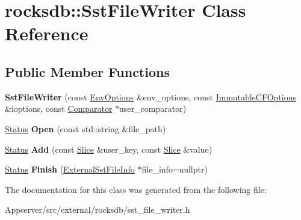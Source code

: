 \hypertarget{classrocksdb_1_1SstFileWriter}{}\section{rocksdb\+:\+:Sst\+File\+Writer Class Reference}
\label{classrocksdb_1_1SstFileWriter}
\subsection*{Public Member Functions}
\begin{DoxyCompactItemize}
\item 
{\bfseries Sst\+File\+Writer} (const \hyperlink{structrocksdb_1_1EnvOptions}{Env\+Options} \&env\+\_\+options, const \hyperlink{structrocksdb_1_1ImmutableCFOptions}{Immutable\+C\+F\+Options} \&ioptions, const \hyperlink{classrocksdb_1_1Comparator}{Comparator} $\ast$user\+\_\+comparator)\hypertarget{classrocksdb_1_1SstFileWriter_a1fe4d1f2d5ad4b1ad8257818d56fdeed}{}\label{classrocksdb_1_1SstFileWriter_a1fe4d1f2d5ad4b1ad8257818d56fdeed}

\item 
\hyperlink{classrocksdb_1_1Status}{Status} {\bfseries Open} (const std\+::string \&file\+\_\+path)\hypertarget{classrocksdb_1_1SstFileWriter_a7093b68b582eaa567eb5ab6d0c87eaba}{}\label{classrocksdb_1_1SstFileWriter_a7093b68b582eaa567eb5ab6d0c87eaba}

\item 
\hyperlink{classrocksdb_1_1Status}{Status} {\bfseries Add} (const \hyperlink{classrocksdb_1_1Slice}{Slice} \&user\+\_\+key, const \hyperlink{classrocksdb_1_1Slice}{Slice} \&value)\hypertarget{classrocksdb_1_1SstFileWriter_abeb5217b8b5c01d7328ed593c272b14d}{}\label{classrocksdb_1_1SstFileWriter_abeb5217b8b5c01d7328ed593c272b14d}

\item 
\hyperlink{classrocksdb_1_1Status}{Status} {\bfseries Finish} (\hyperlink{structrocksdb_1_1ExternalSstFileInfo}{External\+Sst\+File\+Info} $\ast$file\+\_\+info=nullptr)\hypertarget{classrocksdb_1_1SstFileWriter_aa511764ed91a07659b36c1317aaf2f7c}{}\label{classrocksdb_1_1SstFileWriter_aa511764ed91a07659b36c1317aaf2f7c}

\end{DoxyCompactItemize}


The documentation for this class was generated from the following file\+:\begin{DoxyCompactItemize}
\item 
Appserver/src/external/rocksdb/sst\+\_\+file\+\_\+writer.\+h\end{DoxyCompactItemize}
